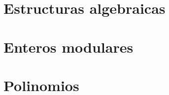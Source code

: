 \section{Estructuras algebraicas}\label{sec:estructuras}


\section{Enteros modulares}\label{sec:modulares}


\section{Polinomios}\label{sec:polinomios}


